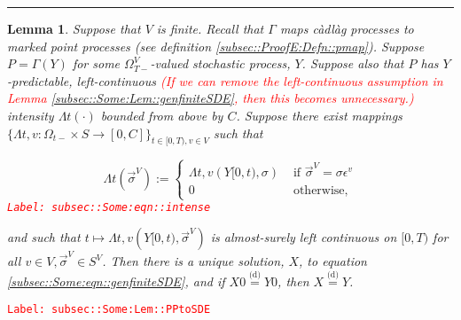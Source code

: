 \documentclass[12pt]{article}
\newcommand{\ra}{\rightarrow}
\newcommand{\te}{\text}
\newcommand{\ep}{\epsilon}
\newcommand{\tr}{\textcolor{red}}
\newcommand{\labe}[1]{\tr{\texttt{Label: #1}}}
\newcommand{\lin}{\rule{\linewidth}{0.4 pt}}
\newcommand{\deq}{\overset{\text{(d)}}{=}}			%
\renewcommand{\v}{v}							%
\renewcommand{\S}{S}							%
\newcommand{\s}{\sigma}							%
\newcommand{\sv}{\vec{\s}}						%
\newcommand{\ev}{\ep}							%
\newcommand{\T}{T}								%
\renewcommand{\t}{t}							%
\newcommand{\sset}{\Omega}						%
\newcommand{\X}{X}								%
\newcommand{\vind}[1]{^{#1}}					%
\newcommand{\carp}[1]{^{#1}}					%
\newcommand{\vsi}[1]{^{#1}}						%
\newcommand{\cind}[1]{_{#1}}					%
\newcommand{\ts}[1]{_{#1}}						%
\newcommand{\const}{C}							%
\newcommand{\XX}{Y}								%
\newcommand{\pmap}{\Gamma}						%
\newcommand{\rp}{P}								%
\newcommand{\ratee}{\Lambda}					%
\newtheorem{lem}[thms]{Lemma}
\begin{document}
\lin

\begin{lem}
Suppose that \(V\) is finite. Recall that \(\pmap{}\) maps c\`adl\`ag processes to marked point processes (see definition \ref{subsec::ProofE:Defn::pmap}). Suppose \(\rp{} = \pmap{}(\XX{}{})\) for some \(\sset\vsi{V}\ts{\T-}\)-valued stochastic process, \(\XX{}{}\). Suppose also that \(\rp{}\) has \(\XX{}{}\)-predictable, left-continuous \tr{(If we can remove the left-continuous assumption in Lemma \ref{subsec::Some:Lem::genfiniteSDE}, then this becomes unnecessary.)} intensity \(\ratee{\t}(\cdot)\) bounded from above by \(\const{}\). Suppose there exist mappings \(\{\ratee{\t,\v}:\sset\vsi{}\ts{\t-}\times \S \ra [0,\const{}]\}_{\t\in[0,\T),\v\in V}\) such that 

\begin{equation}
\ratee{\t}(\sv\cind{}\vsi{V}) := \begin{cases}
\ratee{\t,\v}(\XX{}{[0,\t)},\s) &\te{ if } \sv\cind{}\vsi{V} = \s\ev\vind{\v}\\
0 &\te{ otherwise,}
\end{cases}
\label{subsec::Some:eqn::intense}
\end{equation}
\labe{subsec::Some:eqn::intense}

and such that \(\t\mapsto \ratee{\t,\v}(\XX{}{[0,\t)},\sv\cind{}\vsi{V})\) is almost-surely left continuous on \([0,\T)\) for all \(\v\in V,\sv\cind{}\vsi{V}\in \S\carp{V}\). Then there is a unique solution, \(\X{}{}\), to equation \eqref{subsec::Some:eqn::genfiniteSDE}, and if \(\X{}{0} \deq \XX{}{0}\), then \(\X{}{} \deq \XX{}{}\).

\label{subsec::Some:Lem::PPtoSDE}
\end{lem}
\labe{subsec::Some:Lem::PPtoSDE}
\end{document}

